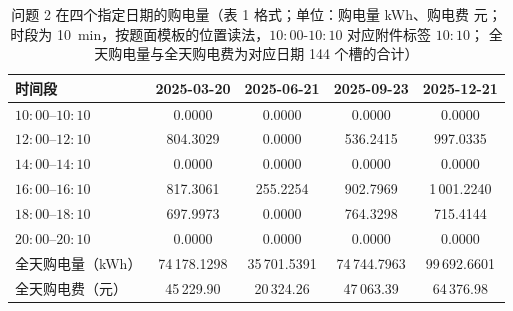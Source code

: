 \begin{table}[htbp]
  \centering
  \caption{问题 2 在四个指定日期的购电量（表 1 格式；单位：购电量 kWh、购电费 元；
           时段为 10~min，按题面模板的位置读法，\(10{:}00\text{-}10{:}10\) 对应附件标签 \(10{:}10\)；
           全天购电量与全天购电费为对应日期 144 个槽的合计）}
  \label{tab:q2-t1}
  \footnotesize
  \setlength{\tabcolsep}{5pt}
  \begin{tabular}{lcccc}
    \toprule
    时间段 & 2025-03-20 & 2025-06-21 & 2025-09-23 & 2025-12-21 \\
    \midrule
    \(10{:}00\)--\(10{:}10\) & 0.0000 & 0.0000 & 0.0000 & 0.0000 \\
    \(12{:}00\)--\(12{:}10\) & 804.3029 & 0.0000 & 536.2415 & 997.0335 \\
    \(14{:}00\)--\(14{:}10\) & 0.0000 & 0.0000 & 0.0000 & 0.0000 \\
    \(16{:}00\)--\(16{:}10\) & 817.3061 & 255.2254 & 902.7969 & 1\,001.2240 \\
    \(18{:}00\)--\(18{:}10\) & 697.9973 & 0.0000 & 764.3298 & 715.4144 \\
    \(20{:}00\)--\(20{:}10\) & 0.0000 & 0.0000 & 0.0000 & 0.0000 \\
    \midrule
    全天购电量（kWh） & 74\,178.1298 & 35\,701.5391 & 74\,744.7963 & 99\,692.6601 \\
    全天购电费（元） & 45\,229.90 & 20\,324.26 & 47\,063.39 & 64\,376.98 \\
    \bottomrule
  \end{tabular}
\end{table}

